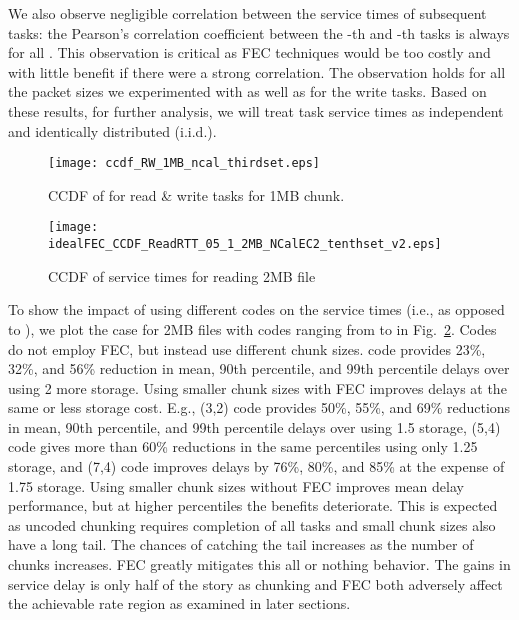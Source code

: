 \documentclass[journal]{IEEEtran}
\begin{document}
We also observe negligible correlation between the service times of subsequent tasks: the Pearson's correlation coefficient between the -th and -th tasks is always  for all .
This observation is critical as FEC techniques would be too costly and with little benefit if there were a strong correlation. The observation holds for all the packet sizes we experimented with as well as for the write tasks. Based on these results, for further analysis, we will treat task service times as independent and identically distributed (i.i.d.). 



\begin{figure}[!t]
\centering
\texttt{[image: ccdf\_RW\_1MB\_ncal\_thirdset.eps]}
\vspace{-10pt}
\caption{CCDF of  for read \& write tasks for 1MB chunk.}
\label{fig:ccdf}
\vspace{-10pt}
\end{figure}


\begin{figure}[!t]
\centering
\texttt{[image: idealFEC\_CCDF\_ReadRTT\_05\_1\_2MB\_NCalEC2\_tenthset\_v2.eps]}
\vspace{-10pt}
\caption{CCDF of service times for reading 2MB file} 
\label{fig:servicetimes}
\vspace{-10pt}
\end{figure}

To show the impact of using different codes on the service times (i.e.,  as opposed to ), we  plot the case for 2MB files with codes ranging from  to  in Fig.~\ref{fig:servicetimes}. Codes  do not employ FEC, but instead use different chunk sizes.  code provides 23\%, 32\%, and 56\% reduction in mean, 90th percentile, and 99th percentile delays over  using 2 more storage. 
Using smaller chunk sizes with FEC improves delays at the same or less storage cost. E.g., (3,2) code provides 
50\%, 55\%, and 69\% reductions in mean, 90th percentile, and 99th percentile delays over  using 1.5 storage, (5,4) code gives more than 60\% reductions in the same percentiles using only 1.25 storage, and (7,4) code improves delays by 76\%, 80\%, and 85\% at the expense of 1.75 storage.
Using smaller chunk sizes without FEC improves mean delay performance, but at higher percentiles the benefits deteriorate. This is expected as uncoded chunking requires completion of all tasks and small chunk sizes also have a long tail. The chances of catching the tail increases as the number of chunks increases.  FEC greatly mitigates this all or nothing behavior. 
The gains in service delay  is only half of the story as chunking and FEC both adversely affect the achievable rate region as examined in later sections.
\end{document}
